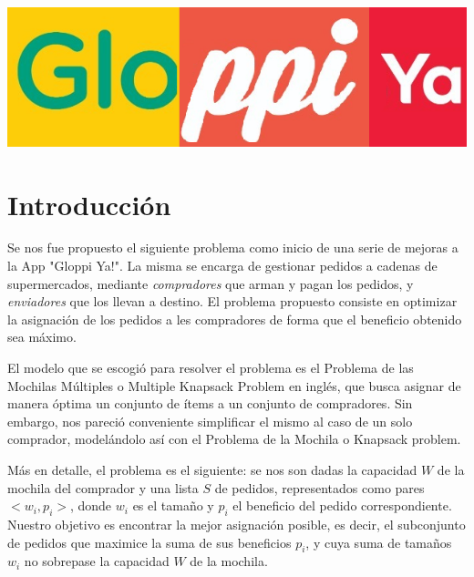 \documentclass[a4paper]{article}
\begin{document}
\thispagestyle{empty}


\maketitle
\newpage

\thispagestyle{empty}
\vfill
\begin{center}
    \includegraphics[scale=0.4]{LogoGloppiYa.png}

  \end{center}


\thispagestyle{empty}
\vspace{3cm}
\tableofcontents
\newpage


\newpage

\section{Introducción}

Se nos fue propuesto el siguiente problema como inicio de una serie de mejoras a la App "Gloppi Ya!". La misma se encarga de gestionar pedidos a cadenas de supermercados, mediante \textit{compradores} que arman y pagan los pedidos, y \textit{enviadores} que los llevan a destino. El problema propuesto consiste en optimizar la asignación de los pedidos a les compradores de forma que el beneficio obtenido sea máximo. 


El modelo que se escogió para resolver el problema es el Problema de las Mochilas Múltiples o Multiple Knapsack Problem  en inglés, que busca asignar de manera óptima un conjunto de ítems a un conjunto de compradores. Sin embargo, nos pareció conveniente simplificar el mismo al caso de un solo comprador, modelándolo así con el Problema de la Mochila o Knapsack problem. 

Más en detalle, el problema es el siguiente: se nos son dadas la capacidad $W$ de la mochila del comprador y una lista $S$ de pedidos, representados como pares $<w_i, p_i>$, donde $w_i$ es el tamaño y $p_i$ el beneficio del pedido correspondiente. Nuestro objetivo es encontrar la mejor asignación posible, es decir, el subconjunto de pedidos que maximice la suma de sus beneficios $p_i$, y cuya suma de tamaños $w_i$ no sobrepase la capacidad $W$ de la mochila. 
\end{document}
